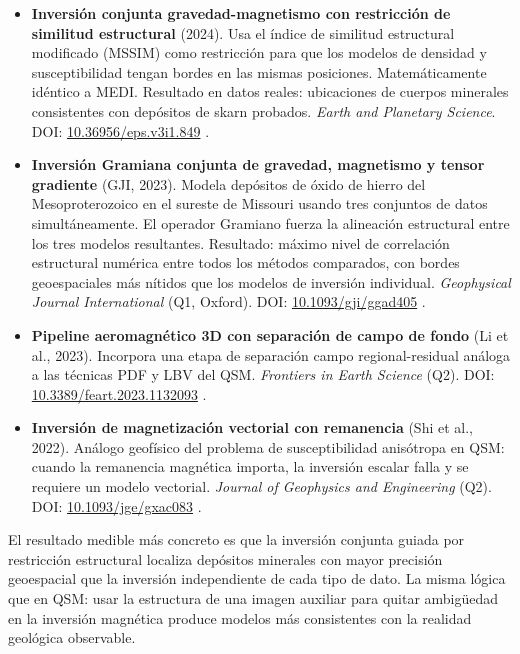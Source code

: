 \documentclass[12pt, a4paper]{article}
\begin{document}
\begin{itemize}[leftmargin=2em, itemsep=5pt]

  \item \textbf{Inversión conjunta gravedad-magnetismo con restricción de similitud estructural} (2024). Usa el índice de similitud estructural modificado (MSSIM) como restricción para que los modelos de densidad y susceptibilidad tengan bordes en las mismas posiciones. Matemáticamente idéntico a MEDI. Resultado en datos reales: ubicaciones de cuerpos minerales consistentes con depósitos de skarn probados. \emph{Earth and Planetary Science}. DOI: \href{https://doi.org/10.36956/eps.v3i1.849}{10.36956/eps.v3i1.849} \cite{JointSSIM2024}.

  \item \textbf{Inversión Gramiana conjunta de gravedad, magnetismo y tensor gradiente} (GJI, 2023). Modela depósitos de óxido de hierro del Mesoproterozoico en el sureste de Missouri usando tres conjuntos de datos simultáneamente. El operador Gramiano fuerza la alineación estructural entre los tres modelos resultantes. Resultado: máximo nivel de correlación estructural numérica entre todos los métodos comparados, con bordes geoespaciales más nítidos que los modelos de inversión individual. \emph{Geophysical Journal International} (Q1, Oxford). DOI: \href{https://doi.org/10.1093/gji/ggad405}{10.1093/gji/ggad405} \cite{GrJointGJI2023}.

  \item \textbf{Pipeline aeromagnético 3D con separación de campo de fondo} (Li et al., 2023). Incorpora una etapa de separación campo regional-residual análoga a las técnicas PDF y LBV del QSM. \emph{Frontiers in Earth Science} (Q2). DOI: \href{https://doi.org/10.3389/feart.2023.1132093}{10.3389/feart.2023.1132093} \cite{Feart2023Aeromagnetic}.

  \item \textbf{Inversión de magnetización vectorial con remanencia} (Shi et al., 2022). Análogo geofísico del problema de susceptibilidad anisótropa en QSM: cuando la remanencia magnética importa, la inversión escalar falla y se requiere un modelo vectorial. \emph{Journal of Geophysics and Engineering} (Q2). DOI: \href{https://doi.org/10.1093/jge/gxac083}{10.1093/jge/gxac083} \cite{Mag2022Geophys}.

\end{itemize}

\begin{novedad}
  El resultado medible más concreto es que la inversión conjunta guiada por restricción estructural localiza depósitos minerales con mayor precisión geoespacial que la inversión independiente de cada tipo de dato. La misma lógica que en QSM: usar la estructura de una imagen auxiliar para quitar ambigüedad en la inversión magnética produce modelos más consistentes con la realidad geológica observable.
\end{novedad}
\end{document}
